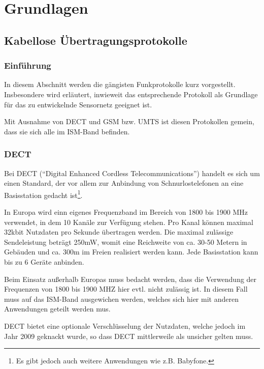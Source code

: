 
\chapter{Grundlagen}\label{Grundlagen}

\section{Kabellose Übertragungsprotokolle}
    \subsection{Einführung}
    In diesem Abschnitt werden die gängisten Funkprotokolle kurz vorgestellt. Insbesondere wird erläutert,
    inwieweit das entsprechende Protokoll als Grundlage für das zu entwickelnde Sensornetz geeignet ist.

    Mit Ausnahme von DECT und GSM bzw. UMTS ist diesen Protokollen gemein, dass sie sich alle im ISM-Band 
    befinden. 

\subsection{DECT}

Bei DECT ("`Digital Enhanced Cordless Telecommunications"') handelt es sich um einen Standard, 
der vor allem zur Anbindung von Schnurlostelefonen an eine Basisstation gedacht ist\footnote{Es gibt
jedoch auch weitere Anwendungen wie z.B. Babyfone.}. 

In Europa wird einn eigenes Frequenzband im Bereich von 1800 bis 1900 MHz verwendet, in dem 10 
Kanäle zur Verfügung stehen. Pro Kanal können maximal 32kbit Nutzdaten pro Sekunde übertragen
werden. Die maximal zulässige Sendeleistung beträgt 250mW, womit eine Reichweite von ca. 30-50
Metern in Gebäuden und ca. 300m im Freien realisiert werden kann. Jede Basisstation kann
bis zu 6 Geräte anbinden.

Beim Einsatz außerhalb Europas muss bedacht werden, dass die Verwendung der Frequenzen von
1800 bis 1900 MHZ hier evtl. nicht zulässig ist. In diesem Fall muss auf das ISM-Band 
ausgewichen werden, welches sich hier mit anderen Anwendungen geteilt werden mus.

DECT bietet eine optionale Verschlüsselung der Nutzdaten, welche jedoch im Jahr 2009 geknackt
wurde, so dass DECT mittlerweile als unsicher gelten muss.

